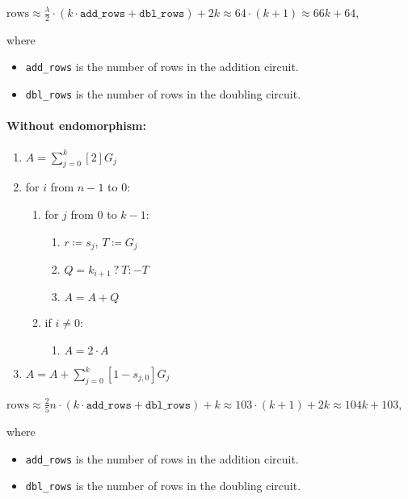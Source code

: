 \begin{center}
	$\text{rows} \approx \frac{\lambda}{2} \cdot (k \cdot \texttt{add\_rows} + \texttt{dbl\_rows}) + 2k \approx 64 \cdot (k + 1) \approx 66k + 64$,
\end{center}
where
\begin{itemize}
	\item \texttt{add\_rows} is the number of rows in the addition circuit. 
	\item \texttt{dbl\_rows} is the number of rows in the doubling circuit. 
\end{itemize}

\paragraph{Without endomorphism:} 

\begin{enumerate}
	\item $A = \sum\limits_{j = 0}^{k} [2]G_j$
	\item for $i$ from $n - 1$ to $0$:
	\begin{enumerate}
		\item for $j$ from $0$ to $k-1$:
		\begin{enumerate}
			\item $r \coloneqq s_j$, $T \coloneqq G_j$
			\item $Q = k_{i + 1} \: ? \: T : -T$
			\item $A = A + Q$
		\end{enumerate}
		\item if $i \neq 0$:
		\begin{enumerate}
			\item $A = 2 \cdot A$
		\end{enumerate}
	\end{enumerate}
	\item $A = A + \sum\limits_{j = 0}^{k} [1 - s_{j, 0}]G_j$ 
\end{enumerate}

\begin{center}
	$\text{rows} \approx \frac{2}{5}n \cdot (k \cdot \texttt{add\_rows} + \texttt{dbl\_rows}) + k \approx 103 \cdot (k + 1) + 2k \approx 104k + 103$,
\end{center}
where
\begin{itemize}
	\item \texttt{add\_rows} is the number of rows in the addition circuit. 
	\item \texttt{dbl\_rows} is the number of rows in the doubling circuit. 
\end{itemize}
